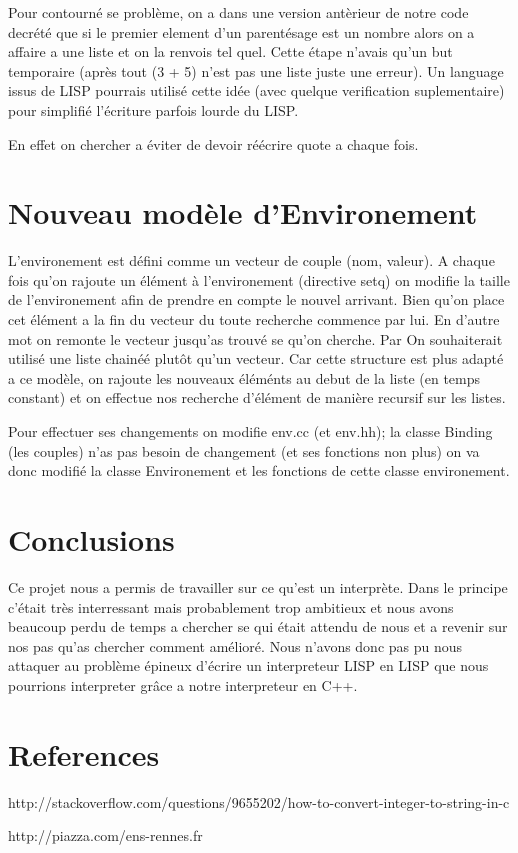 \documentclass[a4paper]{article}
\begin{document}
	Pour contourné se problème, on a dans une version antèrieur de notre code decrété que si le premier element d'un parentésage est un nombre alors on a affaire a une liste et on la renvois tel quel. Cette étape n'avais qu'un but temporaire (après tout (3 + 5) n'est pas une liste juste une erreur). Un language issus de LISP pourrais utilisé cette idée (avec quelque verification suplementaire) pour simplifié l'écriture parfois lourde du LISP. 
	
	En effet on chercher a éviter de devoir réécrire quote a chaque fois.
	
\section{Nouveau modèle d'Environement}
	L'environement est défini comme un vecteur de couple (nom, valeur). A chaque fois qu'on rajoute un élément à l'environement (directive setq) on modifie la taille de l'environement afin de prendre en compte le nouvel arrivant. Bien qu'on place cet élément a la fin du vecteur du toute recherche commence par lui. En d'autre mot on remonte le vecteur jusqu'as trouvé se qu'on cherche. Par  On souhaiterait utilisé une liste chainéé plutôt qu'un vecteur. Car cette structure est plus adapté a ce modèle, on rajoute les nouveaux éléménts au debut de la liste (en temps constant) et on effectue nos recherche d'élément de manière recursif sur les listes.
	
	Pour effectuer ses changements on modifie env.cc (et env.hh); la classe Binding (les couples) n'as pas besoin de changement (et ses fonctions non plus) on va donc modifié la classe Environement et les fonctions de cette classe environement.
	
\section{Conclusions}
	
	Ce projet nous a permis de travailler sur ce qu'est un interprète. Dans le principe c'était très interressant mais probablement trop ambitieux et nous avons beaucoup perdu de temps a chercher se qui était attendu de nous et a revenir sur nos pas qu'as chercher comment amélioré. Nous n'avons donc pas pu nous attaquer au problème épineux d'écrire un interpreteur LISP en LISP que nous pourrions interpreter grâce a notre interpreteur en C++.

\section{References}
http://stackoverflow.com/questions/9655202/how-to-convert-integer-to-string-in-c


http://piazza.com/ens-rennes.fr
\end{document}
